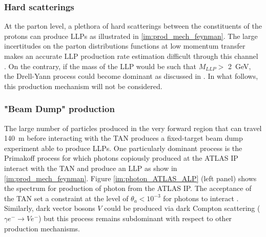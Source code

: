 		\subsubsection{Hard scatterings}
		At the parton level, a plethora of hard scatterings between the constituents of the protons can produce LLPs as illustrated in \ref{im:prod_mech_feynman}. The large incertitudes on the parton distributions functions at low momentum transfer makes an accurate LLP production rate estimation difficult through this channel \cite{FASER_LLP}. On the contrary, if the mass of the LLP would be such that $M_{LLP} >$ \SI{2}{\giga\electronvolt}, the Drell-Yann process could become dominant as discussed in \cite{Drell_Yann}. In what follows, this production mechanism will not be considered. 
		
		\subsubsection{"Beam Dump" production}
		
		The large number of particles produced in the very forward region that can travel \SI{140}{\meter} before interacting with the TAN produces a fixed-target beam dump experiment able to produce LLPs. One particularly dominant process is the Primakoff process for which photons copiously produced at the ATLAS IP interact with the TAN and produce an LLP as show in \ref{im:prod_mech_feynman}. Figure \ref{im:photon_ATLAS_ALP} (left panel) shows the spectrum for production of photon from the ATLAS IP. The acceptance of the TAN set a constraint at the level of $\theta_a < 10^{-3}$ for photons to interact \cite{Primakoff_process}. Similarly, dark vector bosons $V$ could be produced via dark Compton scattering ($ \gamma e^- \rightarrow V e^-$) but this process remains subdominant with respect to other production mechanisms. 
	
		
